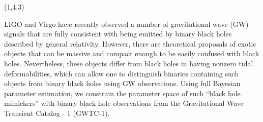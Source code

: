 \documentclass[a1,portrait]{a1poster}
\newcommand{\headingcolor}{\color{BannerElevenColor}}
\def\LHead#1{\noindent{\LARGE \headingcolor #1}\smallskip}
\def\emphasis#1{{\large \color{BannerTwoColor} {#1}}}
\begin{document}
\begin{textblock}{7}(1,4.3)  
\begin{spacing}{3}
\emphasis{LIGO and Virgo have recently observed a number of gravitational wave (GW) signals that are fully consistent with being emitted by binary black holes described by general relativity. However, there are theoretical proposals of exotic objects that can be massive and compact enough to be easily confused with black holes. Nevertheless, these objects differ from black holes in having nonzero tidal deformabilities, which can allow one to distinguish binaries containing such objects from binary black holes using GW observations. Using full Bayesian parameter estimation, we constrain the parameter space of such “black hole mimickers” with binary black hole observations from the Gravitational Wave Transient Catalog - 1 (GWTC-1).}
\end{spacing}

\end{textblock}
\end{document}
